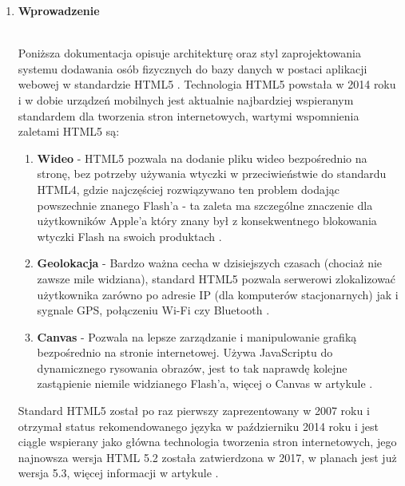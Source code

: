 \documentclass[a4paper,11pt]{article}
\begin{document}
\begin{enumerate}
	\item \textbf{{\Large Wprowadzenie}}\\ \\
		\begin{large}
		\hspace*{1cm}
		Poniższa dokumentacja opisuje architekturę oraz styl zaprojektowania systemu dodawania osób fizycznych do bazy danych w postaci aplikacji webowej w standardzie HTML5 \cite{hoy2011html5}.  Technologia HTML5 powstała w 2014 roku i w dobie urządzeń mobilnych jest aktualnie najbardziej wspieranym standardem dla tworzenia stron internetowych, wartymi wspomnienia zaletami HTML5 są:
			\begin{enumerate}
				\item \textbf{Wideo} - HTML5 pozwala na dodanie pliku wideo bezpośrednio na stronę, bez potrzeby używania wtyczki w przeciwieństwie do standardu HTML4, gdzie najczęściej rozwiązywano ten problem dodając powszechnie znanego Flash'a - ta zaleta ma szczególne znaczenie dla użytkowników Apple'a który znany był z konsekwentnego blokowania wtyczki Flash na swoich produktach \cite{johnson2015flash}.
				
				\item \textbf{Geolokacja} - Bardzo ważna cecha w dzisiejszych czasach (chociaż nie zawsze mile widziana), standard HTML5 pozwala serwerowi zlokalizować użytkownika zarówno po adresie IP (dla komputerów stacjonarnych) jak i sygnale GPS, połączeniu Wi-Fi czy Bluetooth \cite{holdener2011html5}.
				
				\item \textbf{Canvas} - Pozwala na lepsze zarządzanie i manipulowanie grafiką bezpośrednio na stronie internetowej. Używa JavaScriptu do dynamicznego rysowania obrazów, jest to tak naprawdę kolejne zastąpienie niemile widzianego Flash'a, więcej o Canvas w artykule \cite{Canvas}.
			\end{enumerate}
		\vspace{1cm}			
		Standard HTML5 został po raz pierwszy zaprezentowany w 2007 roku i otrzymał status rekomendowanego języka w październiku 2014 roku i jest ciągle wspierany jako główna technologia tworzenia stron internetowych, jego najnowsza wersja HTML 5.2 została zatwierdzona w 2017, w planach jest już wersja 5.3, więcej informacji w artykule \cite{html53}.
		
		
		\end{large}




\end{enumerate}
\end{document}
